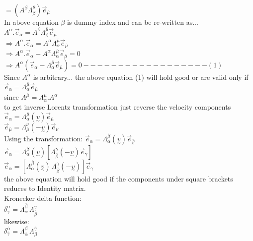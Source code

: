 \documentclass[11pt,a4paper]{article}
\begin{document}
\begin{enumerate}
\begin{enumerate}
		            $=\left(A^{\beta} \Lambda^{\overline{\mu}}_{\beta} \right)\vec{e}_{\overline{\mu}}$\\
		            In above equation $\beta$ is dummy index and can be re-written as...\\
		            $A^{\alpha}.\vec{e}_{\alpha} = A^{\beta}  \Lambda^{\overline{\mu}}_{\beta}\vec{e}_{\overline{\mu}}$\\
		            $\Rightarrow A^{\alpha}.\vec{e}_{\alpha} = A^{\alpha}  \Lambda^{\overline{\mu}}_{\alpha}\vec{e}_{\overline{\mu}}$\\
		            $\Rightarrow A^{\alpha}.\vec{e}_{\alpha} - A^{\alpha}  \Lambda^{\overline{\mu}}_{\alpha}\vec{e}_{\overline{\mu}}=0$\\
		            $\Rightarrow A^{\alpha}\left(\vec{e}_{\alpha} - \Lambda^{\overline{\mu}}_{\alpha}\vec{e}_{\overline{\mu}}\right)=0------------------(1)$\\
		            Since $A^{\alpha}$ is arbitrary... the above equation (1) will hold good or are valid only if\\
		            $\vec{e}_{\alpha} = \Lambda^{\overline{\mu}}_{\alpha}\vec{e}_{\overline{\mu}}$\\
		            since $A^{\overline{\mu}}=\Lambda^{\overline{\mu}}_{\alpha}.A^{\alpha}$\\
		            to get inverse Lorentz transformation just reverse the velocity components\\
		            $\vec{e}_{\alpha} = \Lambda^{\overline{\mu}}_{\alpha}(\underset{\sim}{v})\vec{e}_{\overline{\mu}}$\\
		            $\vec{e}_{\overline{\mu}} = \Lambda^{\nu}_{\overline{\mu}}(-\underset{\sim}{v})\vec{e}_{\nu} $\\
		            Using the transformation:
		            $\vec{e}_{\alpha} = \Lambda^{\overline{\beta}}_{\alpha}(\underset{\sim}{v})\vec{e}_{\overline{\beta}}$\\
		            $\vec{e}_{\alpha} = \Lambda^{\overline{\beta}}_{\alpha}(\underset{\sim}{v})\left[\Lambda^{\gamma}_{\overline{\beta}}(-\underset{\sim}{v})\vec{e}_{\gamma}\right]$\\
		            $\vec{e}_{\alpha} = \left[\Lambda^{\overline{\beta}}_{\alpha}(\underset{\sim}{v})\, \Lambda^{\gamma}_{\overline{\beta}}(-\underset{\sim}{v})\right]\vec{e}_{\gamma}$\\
		            the above equation will hold good if the components under square brackets reduces to Identity matrix.\\
		            Kronecker delta function:\\
		            $\delta^{\alpha}_{\gamma}= \Lambda^{\overline{\beta}}_{\alpha}\, \Lambda^{\gamma}_{\overline{\beta}}$\\
		            likewise:\\
		            $\delta^{\overline\alpha}_{\overline\gamma}= \Lambda^{\beta}_{\overline\alpha}\, \Lambda^{\overline\gamma}_{\beta}$\\


\end{enumerate}
\end{enumerate}
\end{document}
